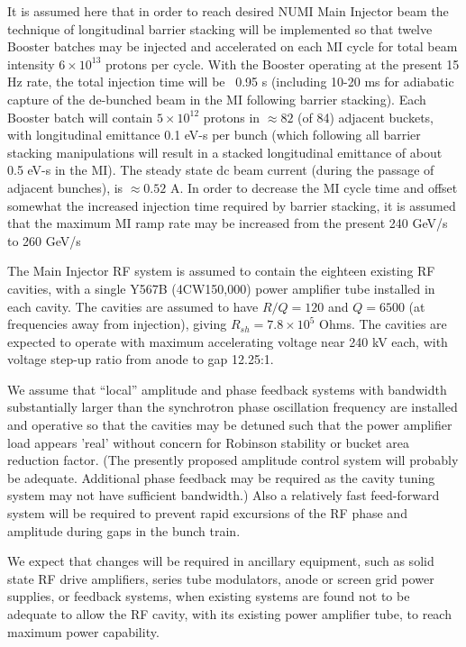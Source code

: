 \documentclass{article}
\begin{document}
It is assumed here that in order to reach desired NUMI Main Injector beam the 
technique of longitudinal barrier stacking will be implemented so that twelve 
Booster batches may be injected and accelerated on each MI cycle for total 
beam intensity $6 \times 10^{13}$ protons per cycle.
With the Booster operating at the present 15 Hz rate, the total 
injection time will be ~0.95 s (including 10-20 ms for adiabatic capture of 
the de-bunched beam in the MI following barrier stacking).  Each Booster 
batch will contain $5 \times 10^{12}$ protons in $\approx 82$ (of 84) 
adjacent buckets, with longitudinal emittance 0.1 eV-s per bunch (which
following all barrier stacking manipulations will result in a 
stacked longitudinal emittance of about 0.5 eV-s in the MI). The steady 
state dc beam current (during the passage of adjacent bunches), is 
$\approx0.52$ A. In 
order to decrease the MI cycle time and offset somewhat the increased 
injection time required by barrier stacking, it is assumed that the maximum 
MI ramp rate may be increased from the present 240 GeV/s to 260 GeV/s 
      
      The Main Injector RF system is assumed to contain  the eighteen 
existing RF cavities, with a single Y567B (4CW150,000) power amplifier tube 
installed in each cavity. The cavities are assumed to have $R/Q = 120$ and 
$Q = 6500$ (at frequencies away from injection), 
giving $R_{sh}=7.8 \times 10^5$ Ohms.  The 
cavities are expected to operate with maximum accelerating voltage near 
240 kV each, with voltage step-up ratio from anode to gap 12.25:1.
      
      We assume that ``local'' amplitude and phase feedback systems with 
bandwidth substantially larger than the synchrotron phase oscillation 
frequency are installed and operative so that the cavities may be detuned such 
that the power amplifier load appears 'real' without concern for Robinson 
stability or bucket area reduction factor.  (The presently proposed amplitude 
control system will probably be adequate.  Additional phase feedback may be 
required as the cavity tuning system may not have sufficient bandwidth.)  
Also a relatively fast feed-forward system will be required to prevent rapid 
excursions of the RF phase and amplitude during gaps in the bunch train.

 We expect that changes will be required in ancillary equipment, such as solid 
state RF drive amplifiers, series tube modulators, anode or screen grid power 
supplies, or feedback systems, when existing systems are found not to be 
adequate to allow the RF cavity, with its existing power amplifier tube, 
to reach maximum power capability.
\end{document}
